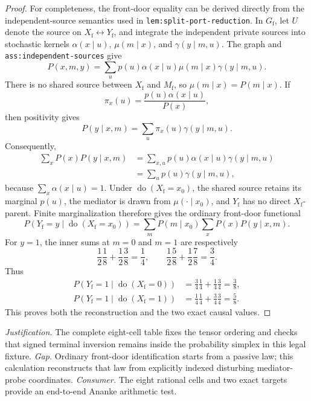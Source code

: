 \documentclass{article}
\begin{document}
\begin{proof}
For completeness, the front-door equality can be derived directly from the independent-source semantics used in \texttt{lem:split-port-reduction}.  In \(G_{\mathrm f}\), let \(U\) denote the source on \(X_{\mathrm f}\leftrightarrow Y_{\mathrm f}\), and integrate the independent private sources into stochastic kernels \(\alpha(x\mid u)\), \(\mu(m\mid x)\), and \(\gamma(y\mid m,u)\).  The graph and \texttt{ass:independent-sources} give
\[
 P(x,m,y)=\sum_u p(u)\alpha(x\mid u)\mu(m\mid x)\gamma(y\mid m,u).
\]
There is no shared source between \(X_{\mathrm f}\) and \(M_{\mathrm f}\), so \(\mu(m\mid x)=P(m\mid x)\).  If
\[
 \pi_x(u)=\frac{p(u)\alpha(x\mid u)}{P(x)},
\]
then positivity gives
\[
 P(y\mid x,m)=\sum_u\pi_x(u)\gamma(y\mid m,u).
\]
Consequently,
\[
\begin{aligned}
 \sum_xP(x)P(y\mid x,m)
 &=\sum_{x,u}p(u)\alpha(x\mid u)\gamma(y\mid m,u)\\
 &=\sum_up(u)\gamma(y\mid m,u),
\end{aligned}
\]
because \(\sum_x\alpha(x\mid u)=1\).  Under \(\operatorname{do}(X_{\mathrm f}=x_0)\), the shared source retains its marginal \(p(u)\), the mediator is drawn from \(\mu(\cdot\mid x_0)\), and \(Y_{\mathrm f}\) has no direct \(X_{\mathrm f}\)-parent.  Finite marginalization therefore gives the ordinary front-door functional
\[
 P(Y_{\mathrm f}=y\mid\operatorname{do}(X_{\mathrm f}=x_0))
 =\sum_mP(m\mid x_0)\sum_xP(x)P(y\mid x,m).
\]
For \(y=1\), the inner sums at \(m=0\) and \(m=1\) are respectively
\[
 \frac12\frac18+\frac12\frac38=\frac14,
 \qquad
 \frac12\frac58+\frac12\frac78=\frac34.
\]
Thus
\[
\begin{aligned}
 P(Y_{\mathrm f}=1\mid\operatorname{do}(X_{\mathrm f}=0))
 &=\frac34\frac14+\frac14\frac34=\frac38,\\
 P(Y_{\mathrm f}=1\mid\operatorname{do}(X_{\mathrm f}=1))
 &=\frac14\frac14+\frac34\frac34=\frac58.
\end{aligned}
\]
This proves both the reconstruction and the two exact causal values.
\end{proof}
\par\smallskip\noindent \textit{Justification.} The complete eight-cell table fixes the tensor ordering and checks that signed terminal inversion remains inside the probability simplex in this legal fixture. \textit{Gap.} Ordinary front-door identification starts from a passive law; this calculation reconstructs that law from explicitly indexed disturbing mediator-probe coordinates. \textit{Consumer.} The eight rational cells and two exact targets provide an end-to-end Ananke arithmetic test.
\end{document}
